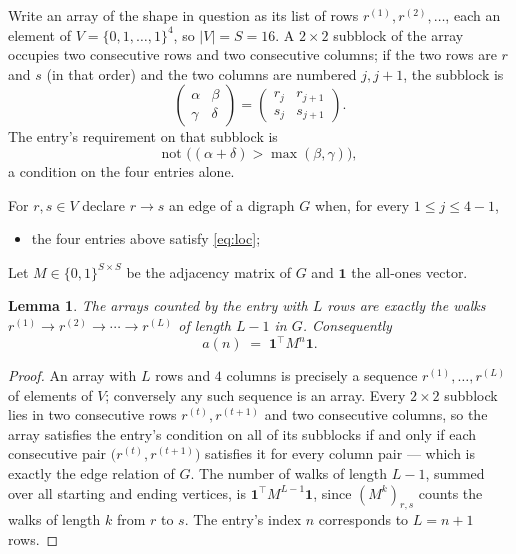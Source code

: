 \documentclass[11pt,a4paper]{article}
\theoremstyle{plain}
\newtheorem{lemma}[theorem]{Lemma}
\theoremstyle{definition}
\begin{document}
Write an array of the shape in question as its list of rows
$r^{(1)},r^{(2)},\dots$, each an element of
$V=\{0,1,\dots,1\}^{4}$, so $|V|=S=16$. A $2\times2$ subblock of the array
occupies two consecutive rows and two consecutive columns; if the two rows are $r$
and $s$ (in that order) and the two columns are numbered $j,j+1$,
the subblock is
\[
\begin{pmatrix}\alpha&\beta\\\gamma&\delta\end{pmatrix}=\begin{pmatrix}r_j&r_{j+1}\\s_j&s_{j+1}\end{pmatrix}.
\]
The entry's requirement on that subblock is
\begin{equation}\label{eq:loc}
\text{not }\bigl((\alpha+\delta)>\max(\beta,\gamma)\bigr),
\end{equation}
a condition on the four entries alone.

For $r,s\in V$ declare $r\to s$ an edge of a digraph $G$ when, for every
$1\le j\le 4-1$,
\begin{itemize}
\item the four entries above satisfy \eqref{eq:loc};

\end{itemize}
Let $M\in\{0,1\}^{S\times S}$ be the adjacency matrix of $G$ and $\mathbf{1}$ the
all-ones vector.

\begin{lemma}\label{lem:walk}
The arrays counted by the entry with $L$ rows are exactly the walks
$r^{(1)}\to r^{(2)}\to\cdots\to r^{(L)}$ of length $L-1$ in $G$. Consequently
\[
a(n)\;=\;\mathbf{1}^{\!\top}M^{n}\mathbf{1} .
\]
\end{lemma}

\begin{proof}
An array with $L$ rows and $4$ columns is precisely a sequence
$r^{(1)},\dots,r^{(L)}$ of elements of $V$; conversely any such sequence is an array.
Every $2\times2$ subblock lies in two consecutive rows $r^{(t)},r^{(t+1)}$ and two
consecutive columns, so the array satisfies the entry's condition on all of its subblocks
if and only if each consecutive pair $\bigl(r^{(t)},r^{(t+1)}\bigr)$ satisfies it for
every column pair --- which is exactly the edge relation of $G$. The number of walks of
length $L-1$, summed over all starting and ending vertices, is
$\mathbf{1}^{\!\top}M^{L-1}\mathbf{1}$, since $(M^{k})_{r,s}$ counts the walks of
length $k$ from $r$ to $s$. The entry's index $n$ corresponds to $L=n+1$ rows.
\end{proof}
\end{document}
